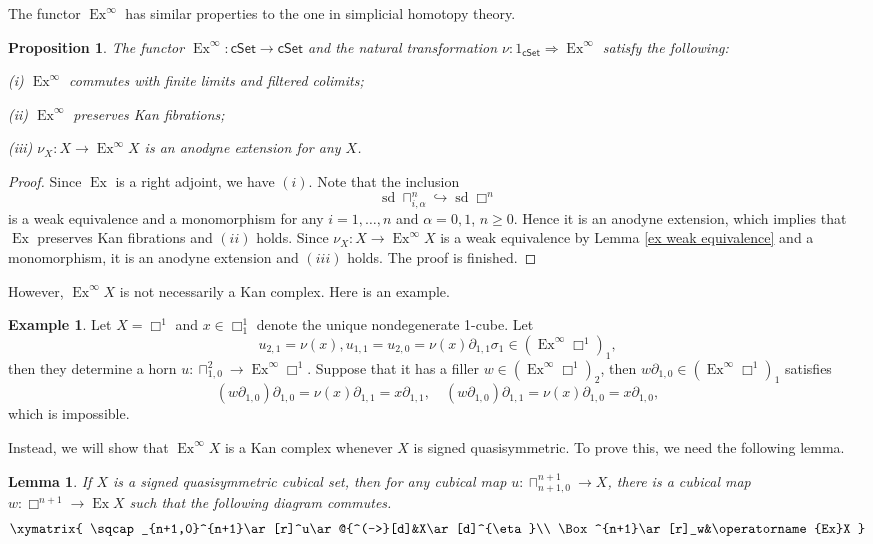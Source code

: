 \documentclass[oneside, 12pt]{amsart}
\numberwithin{equation}{section}
\theoremstyle{plain}
\newtheorem{proposition}[theorem]{Proposition}
\newtheorem{lemma}[theorem]{Lemma}
\theoremstyle{definition}
\newtheorem{example}[theorem]{Example}
\theoremstyle{remark}
\newcommand{\cSet}{\mathsf{cSet}}
\newcommand{\sd}{\operatorname{sd}}
\newcommand{\ex}{\operatorname{Ex}}
\begin{document}
	The functor $\ex^\infty$ has similar properties to the one in simplicial homotopy theory.
	\begin{proposition}
		\label{cubical Ex}
		The functor $\ex^\infty\colon\cSet\to\cSet$ and the natural transformation $\nu\colon1_{\cSet}\Rightarrow\ex^\infty$ satisfy the following:
		
		
		
		\noindent(i) $\ex^\infty$ commutes with finite limits and filtered colimits;
		
		
		\noindent(ii) $\ex^\infty$ preserves Kan fibrations;
		
		
		\noindent(iii) $\nu_X\colon X\to\ex^\infty X$ is an anodyne extension for any $X$.
		
		
		
		
		
	\end{proposition}
	\begin{proof}
		Since $\ex$ is a right adjoint, we have $(i)$. Note that the inclusion
		\[
		\sd\sqcap_{i,\alpha}^n\hookrightarrow\sd\Box^n
		\]
		is a weak equivalence and a monomorphism for any $i=1,\ldots,n$ and $\alpha=0,1$, $n\ge0$. Hence it is an anodyne extension, which implies that $\ex$ preserves Kan fibrations and $(ii)$ holds. Since $\nu_X\colon X\to\ex^\infty X$ is a weak equivalence by Lemma \ref{ex weak equivalence} and a monomorphism, it is an anodyne extension and $(iii)$ holds. The proof is finished.
	\end{proof}
	However, $\ex^\infty X$ is not necessarily a Kan complex. Here is an example.
	\begin{example}
		Let $X=\Box^1$ and $x\in\Box_1^1$ denote the unique nondegenerate 1-cube. Let
		\[
		u_{2,1}=\nu(x),u_{1,1}=u_{2,0}=\nu(x)\partial_{1,1}\sigma_1\in(\ex^\infty\Box^1)_1,
		\]
		then they determine a horn $u\colon\sqcap_{1,0}^2\to\ex^\infty\Box^1$. Suppose that it has a filler $w\in(\ex^\infty\Box^1)_2$, then $w\partial_{1,0}\in(\ex^\infty\Box^1)_1$ satisfies
		\[
		(w\partial_{1,0})\partial_{1,0}=\nu(x)\partial_{1,1}=x\partial_{1,1},\quad(w\partial_{1,0})\partial_{1,1}=\nu(x)\partial_{1,0}=x\partial_{1,0},
		\]
		which is impossible.
	\end{example}
	Instead, we will show that $\ex^\infty X$ is a Kan complex whenever $X$ is signed quasisymmetric. To prove this, we need the following lemma.
	\begin{lemma}
		\label{ex filler}
		If $X$ is a signed quasisymmetric cubical set, then for any cubical map $u\colon\sqcap_{n+1,0}^{n+1}\to X$, there is a cubical map $w\colon\Box^{n+1}\to\ex X$ such that the following diagram commutes.
		\[
		\xymatrix{
			\sqcap_{n+1,0}^{n+1}\ar[r]^u\ar@{^(->}[d]&X\ar[d]^{\eta}\\
			\Box^{n+1}\ar[r]_w&\ex X
		}
		\]
	\end{lemma}
\end{document}
